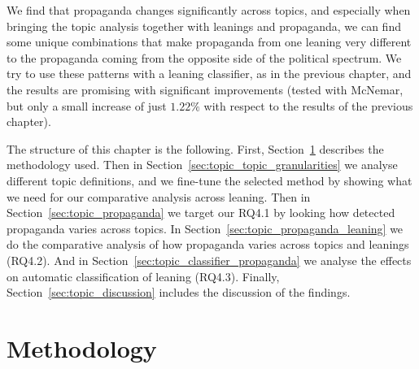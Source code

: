 We find that propaganda changes significantly across topics, and especially when bringing the topic analysis together with leanings and propaganda, we can find some unique combinations that make propaganda from one leaning very different to the propaganda coming from the opposite side of the political spectrum.
We try to use these patterns with a leaning classifier, as in the previous chapter, and the results are promising with significant improvements (tested with McNemar, but only a small increase of just $1.22\%$ with respect to the results of the previous chapter).

The structure of this chapter is the following. First, Section~\ref{sec:topic_method} describes the methodology used. Then in Section~\ref{sec:topic_topic_granularities} we analyse different topic definitions, and we fine-tune the selected method by showing what we need for our comparative analysis across leaning.
Then in Section~\ref{sec:topic_propaganda} we target our RQ4.1 by looking how detected propaganda varies across topics.
In Section~\ref{sec:topic_propaganda_leaning} we do the comparative analysis of how propaganda varies across topics and leanings (RQ4.2). And in Section~\ref{sec:topic_classifier_propaganda} we analyse the effects on automatic classification of leaning (RQ4.3).
Finally, Section~\ref{sec:topic_discussion} includes the discussion of the findings.







\section{\statusgreen Methodology}
\label{sec:topic_method}

